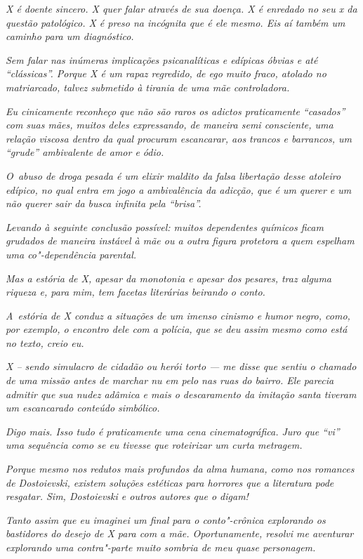 \emph{X é doente sincero. X quer falar através de sua doença. X é
enredado no seu x da questão patológico. X é preso na incógnita que é
ele mesmo. Eis aí também um caminho para um diagnóstico.}~

\emph{Sem falar nas inúmeras implicações psicanalíticas e edípicas
óbvias e até ``clássicas''. Porque X é um rapaz regredido, de ego muito
fraco, atolado no matriarcado, talvez submetido à tirania de uma mãe
controladora.}~

\emph{Eu cinicamente reconheço que não são raros os adictos praticamente
``casados'' com suas mães, muitos deles expressando, de maneira semi
consciente, uma relação viscosa dentro da qual procuram escancarar, aos
trancos e barrancos, um ``grude'' ambivalente de amor e ódio.}~

\emph{O~abuso de droga pesada é um elixir maldito da falsa libertação
desse atoleiro edípico, no qual entra em jogo a ambivalência da adicção,
que é um querer e um não querer sair da busca infinita pela ``brisa''.}~

\emph{Levando à seguinte conclusão possível: muitos dependentes químicos
ficam grudados de maneira instável à mãe ou a outra figura protetora a
quem espelham uma co"-dependência parental.}~

\emph{Mas a estória de X, apesar da monotonia e apesar dos pesares, traz
alguma riqueza e, para mim, tem facetas literárias beirando o conto.}~

\emph{A~estória de X conduz a situações de um imenso cinismo e humor
negro, como, por exemplo, o encontro dele com a polícia, que se deu
assim mesmo como está no texto, creio eu.}~

\emph{X -- sendo simulacro de cidadão ou herói torto --- me disse que
sentiu o chamado de uma missão antes de marchar nu em pelo nas ruas do
bairro. Ele parecia admitir que sua nudez adâmica e mais o descaramento
da imitação santa tiveram um escancarado conteúdo simbólico.}

\emph{Digo mais. Isso tudo é praticamente uma cena cinematográfica. Juro
que ``vi'' uma sequência como se eu tivesse que roteirizar um curta
metragem.}~

\emph{Porque mesmo nos redutos mais profundos da alma humana, como nos
romances de Dostoievski, existem soluções estéticas para horrores que a
literatura pode resgatar. Sim, Dostoievski e outros autores que o
digam!}~

\emph{Tanto assim que eu imaginei um final para o conto"-crônica
explorando os bastidores do desejo de X para com a mãe. Oportunamente,
resolvi me aventurar explorando uma contra"-parte muito sombria de meu
quase personagem.}~

